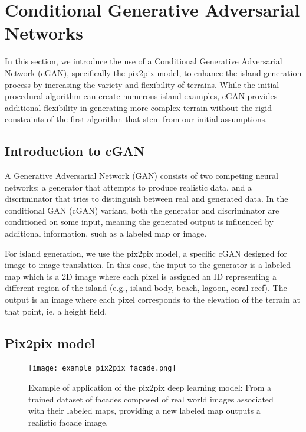 \section{Conditional Generative Adversarial Networks}
\label{sec:coral-island_cGAN-training}

In this section, we introduce the use of a Conditional Generative Adversarial Network (cGAN), specifically the pix2pix model, to enhance the island generation process by increasing the variety and flexibility of terrains. While the initial procedural algorithm can create numerous island examples, cGAN provides additional flexibility in generating more complex terrain without the rigid constraints of the first algorithm that stem from our initial assumptions.

\subsection{Introduction to cGAN}

A Generative Adversarial Network (GAN) consists of two competing neural networks: a generator that attempts to produce realistic data, and a discriminator that tries to distinguish between real and generated data. In the conditional GAN (cGAN) variant, both the generator and discriminator are conditioned on some input, meaning the generated output is influenced by additional information, such as a labeled map or image.

For island generation, we use the pix2pix model, a specific cGAN designed for image-to-image translation. In this case, the input to the generator is a labeled map which is a 2D image where each pixel is assigned an ID representing a different region of the island (e.g., island body, beach, lagoon, coral reef). The output is an image where each pixel corresponds to the elevation of the terrain at that point, ie. a height field.

\subsection{Pix2pix model}

\begin{figure}[H]
	\centering
	\texttt{[image: example\_pix2pix\_facade.png]}
    \caption{Example of application of the pix2pix deep learning model: From a trained dataset of facades composed of real world images associated with their labeled maps, providing a new labeled map outputs a realistic facade image. }
    \label{fig:coral-island_pix2pix-example}
\end{figure}

